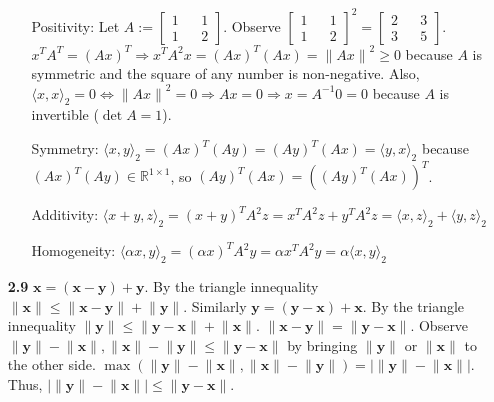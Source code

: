 \documentclass[10pt]{article}
\begin{document}
\begin{enumerate}
    \begin{itemize}
        \item [Positivity:] Let $A:=\begin{bmatrix}
            1 && 1\\
            1 && 2
        \end{bmatrix}$. Observe $\begin{bmatrix}
            1 && 1\\
            1 && 2
        \end{bmatrix}^2=\begin{bmatrix}
            2 && 3\\
            3 && 5
        \end{bmatrix}$. $x^T A^T={(Ax)}^T\Rightarrow x^T A^2 x={(Ax)}^T(Ax)={\lVert Ax\rVert}^2\ge 0$ because $A$ is symmetric and the square of any number is non-negative.
        Also, $\langle x,x\rangle_2=0\Leftrightarrow {\lVert Ax\rVert}^2=0\Rightarrow Ax=0\Rightarrow x=A^{-1}0=0$ because $A$ is invertible ($\det A=1$). 
        \item [Symmetry:] $\langle x,y\rangle_2={(Ax)}^T(Ay)={(Ay)}^T(Ax)=\langle y,x\rangle_2$ because ${(Ax)}^T(Ay)\in \mathbb{R}^{1\times1}$, so ${(Ay)}^T(Ax)={({(Ay)}^T(Ax))}^T$. 
        \item [Additivity:] $\langle x+y,z\rangle_2={(x+y)}^T A^2z=x^T A^2z+y^TA^2z=\langle x,z\rangle_2+\langle y,z\rangle_2$
        \item [Homogeneity:] $\langle \alpha x,y\rangle_2={(\alpha x)}^T A^2y=\alpha x^T A^2y=\alpha \langle x,y\rangle_2$
    \end{itemize}
    \item [\bf{2.9}] $\mathbf{x}=(\mathbf{x}-\mathbf{y})+\mathbf{y}$.
    By the triangle innequality $\lVert \mathbf{x}\rVert\le \lVert \mathbf{x}-\mathbf{y}\rVert +\lVert \mathbf{y}\rVert$.
    Similarly $\mathbf{y}=(\mathbf{y}-\mathbf{x})+\mathbf{x}$. 
    By the triangle innequality $\lVert \mathbf{y}\rVert\le \lVert \mathbf{y}-\mathbf{x}\rVert +\lVert \mathbf{x}\rVert$. 
    $\lVert \mathbf{x}-\mathbf{y}\rVert=\lVert \mathbf{y}-\mathbf{x}\rVert$. 
    Observe $\lVert \mathbf{y}\rVert-\lVert \mathbf{x}\rVert,\lVert \mathbf{x}\rVert-\lVert \mathbf{y}\rVert\le \lVert \mathbf{y}-\mathbf{x}\rVert$ by bringing $\lVert \mathbf{y}\rVert$ or $\lVert \mathbf{x}\rVert$ to the other side. 
    $\max(\lVert \mathbf{y}\rVert-\lVert \mathbf{x}\rVert,\lVert \mathbf{x}\rVert-\lVert \mathbf{y}\rVert)=|\lVert \mathbf{y}\rVert-\lVert \mathbf{x}\rVert|$.
    Thus, $|\lVert \mathbf{y}\rVert-\lVert \mathbf{x}\rVert|\le \lVert \mathbf{y}-\mathbf{x}\rVert$.
\end{enumerate}
\end{document}
